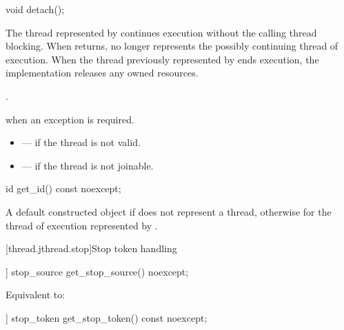 %
\begin{itemdecl}
void detach();
\end{itemdecl}

\begin{itemdescr}
\pnum
\effects
The thread represented by  continues execution
without the calling thread blocking.
When  returns,
 no longer represents the possibly continuing thread of execution.
When the thread previously represented by  ends execution,
the implementation releases any owned resources.

\pnum
\ensures
{}.

\pnum
\throws
{} when an exception is required.

\pnum
\errors
\begin{itemize}
\item {} --- if the thread is not valid.
\item {} --- if the thread is not joinable.
\end{itemize}
\end{itemdescr}

%
\begin{itemdecl}
id get_id() const noexcept;
\end{itemdecl}

\begin{itemdescr}
\pnum
\returns
A default constructed  object
if  does not represent a thread,
otherwise 
for the thread of execution represented by .
\end{itemdescr}

[thread.jthread.stop]{Stop token handling}

%
\begin{itemdecl}
[[nodiscard]] stop_source get_stop_source() noexcept;
\end{itemdecl}

\begin{itemdescr}
\pnum
\effects
Equivalent to: 
\end{itemdescr}

%
\begin{itemdecl}
[[nodiscard]] stop_token get_stop_token() const noexcept;
\end{itemdecl}

